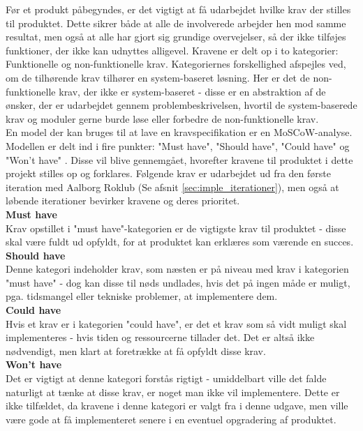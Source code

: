 \label{sec:kravspecifikation}

Før et produkt påbegyndes, er det vigtigt at få udarbejdet hvilke krav der stilles til produktet. Dette sikrer både at alle de involverede arbejder hen mod samme resultat, men også at alle har gjort sig grundige overvejelser, så der ikke tilføjes funktioner, der ikke kan udnyttes alligevel. Kravene er delt op i to kategorier: Funktionelle og non-funktionelle krav. Kategoriernes forskellighed afspejles ved, om de tilhørende krav tilhører en system-baseret løsning. Her er det de non-funktionelle krav, der ikke er system-baseret - disse er en abstraktion af de ønsker, der er udarbejdet gennem problembeskrivelsen, hvortil de system-baserede krav og moduler gerne burde løse eller forbedre de non-funktionelle krav.\\

En model der kan bruges til at lave en kravspecifikation er en MoSCoW-analyse. Modellen er delt ind i fire punkter: "Must have", "Should have", "Could have" og "Won't have" \cite{moscow_book}. Disse vil blive gennemgået, hvorefter kravene til produktet i dette projekt stilles op og forklares. Følgende krav er udarbejdet ud fra den første iteration med Aalborg Roklub (Se afsnit \ref{sec:imple_iterationer}), men også at løbende iterationer bevirker kravene og deres prioritet.\\

\textbf{Must have}\\
Krav opstillet i "must have"\mbox{}-kategorien er de vigtigste krav til produktet - disse skal være fuldt ud opfyldt, for at produktet kan erklæres som værende en succes.\\

\textbf{Should have}\\
Denne kategori indeholder krav, som næsten er på niveau med krav i kategorien "must have"\mbox{} - dog kan disse til nøds undlades, hvis det på ingen måde er muligt, pga. tidsmangel eller tekniske problemer, at implementere dem.\\

\textbf{Could have}\\
Hvis et krav er i kategorien "could have"\mbox{}, er det et krav som så vidt muligt skal implementeres - hvis tiden og ressourcerne tillader det. Det er altså ikke nødvendigt, men klart at foretrække at få opfyldt disse krav.\\

\textbf{Won't have}\\
Det er vigtigt at denne kategori forstås rigtigt - umiddelbart ville det falde naturligt at tænke at disse krav, er noget man ikke vil implementere. Dette er ikke tilfældet, da kravene i denne kategori er valgt fra i denne udgave, men ville være gode at få implementeret senere i en eventuel opgradering af produktet. \\


